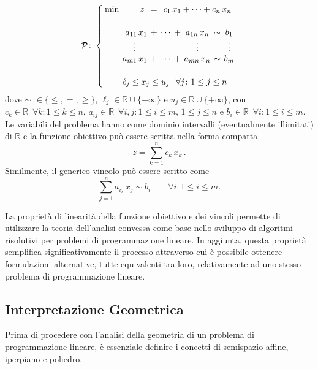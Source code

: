 \begin{equation}
\mathcal{P}\colon
\setlength{\arraycolsep}{2pt}
\left\{\begin{array}{rrcccccc}
\min & z\,\, &=& \multicolumn{5}{c}{c_{1}\,x_{1}+\cdots+c_{n}\,x_{n}} \\[15pt]
     &  a_{11}\,x_{1} &+ &\cdots &+ &a_{1n}\,x_{n} &\sim &b_{1}       \\
     & \multicolumn{1}{c}{\vdots} &&&&\vdots&& \vdots                 \\
     &  a_{m1}\,x_{1} &+ &\cdots &+ &a_{mn}\,x_{n} &\sim &b_{m}       \\[15pt]
     & \multicolumn{7}{l}{\ell_j \le x_{j} \le u_{j} \;\;\, \forall j\colon
     1 \le j \le n}
\end{array}\right.\\[10pt]
\end{equation}
dove $\sim\,\,\in \{ \le, =, \ge \}$, $\ell_j \in \mathbb{R} \cup
\{-\infty\}$ e $u_{j} \in \mathbb{R} \cup \{+\infty\}$, con $c_{k} \in
\mathbb{R} \,\,\, \forall k\colon 1 \le k \le n$, $a_{ij} \in \mathbb{R}
\,\,\, \forall i,j\colon 1 \le i \le m,\, 1 \le j \le n$ e $b_{i} \in
\mathbb{R} \,\,\, \forall i\colon 1 \le i \le m$. Le variabili del
problema hanno come dominio intervalli (eventualmente illimitati) di
$\mathbb{R}$ e la funzione obiettivo può essere scritta nella forma compatta
\begin{equation}
    z = \sum_{k=1}^{n} c_{k}\,x_{k}\,.
\end{equation}
Similmente, il generico vincolo può essere scritto come
\begin{equation}
    \sum_{j=1}^{n}a_{ij}\,x_{j} \sim b_{i} \qquad \forall i\colon 1 \le i \le m
.\end{equation}

La proprietà di linearità della funzione obiettivo e dei vincoli permette
di utilizzare la teoria dell'analisi convessa come base nello sviluppo di
algoritmi risolutivi per problemi di programmazione lineare. In aggiunta,
questa proprietà semplifica significativamente il processo attraverso cui è
possibile ottenere formulazioni alternative, tutte equivalenti tra loro,
relativamente ad uno stesso problema di programmazione lineare.

\subsection{Interpretazione Geometrica}
Prima di procedere con l'analisi della geometria di un problema di
programmazione lineare, è essenziale definire i concetti di semispazio
affine, iperpiano e poliedro.

